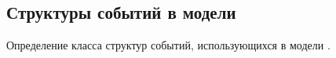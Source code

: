 

\subsection{Структуры событий в модели \Wkm}
\label{sec:wkmo-eventstruct}

Определение класса структур событий, использующихся в модели \Wkm.
